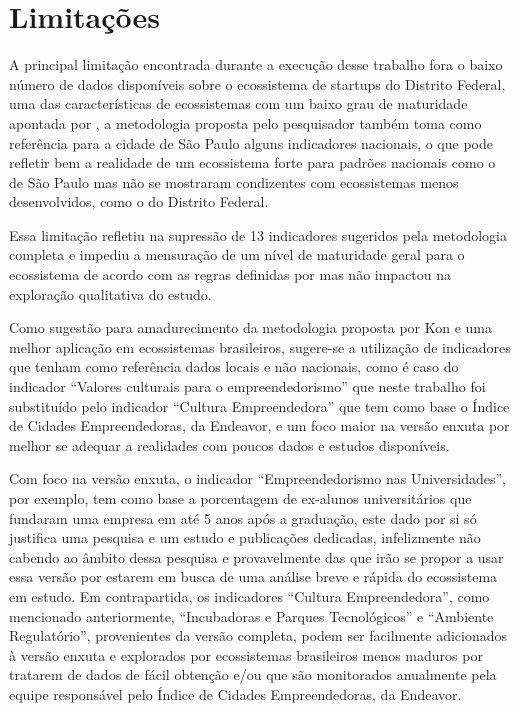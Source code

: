 \section{Limitações}
\label{subsection:limitações}

A principal limitação encontrada durante a execução desse trabalho fora o baixo número de dados disponíveis sobre o ecossistema de startups do Distrito Federal, uma das características de ecossistemas com um baixo grau de maturidade apontada por , a metodologia proposta pelo pesquisador também toma como referência para a cidade de São Paulo alguns indicadores nacionais, o que pode refletir bem a realidade de um ecossistema forte para padrões nacionais como o de São Paulo mas não se mostraram condizentes com ecossistemas menos desenvolvidos, como o do Distrito Federal.

Essa limitação refletiu na supressão de 13 indicadores sugeridos pela metodologia completa e impediu a mensuração de um nível de maturidade geral para o ecossistema de acordo com as regras definidas por  mas não impactou na exploração qualitativa do estudo.

Como sugestão para amadurecimento da metodologia proposta por Kon e uma melhor aplicação em ecossistemas brasileiros, sugere-se a utilização de indicadores que tenham como referência dados locais e não nacionais, como é caso do indicador ``Valores culturais para o empreendedorismo'' que neste trabalho foi substituído pelo indicador ``Cultura Empreendedora'' que tem como base o Índice de Cidades Empreendedoras, da Endeavor, e um foco maior na versão enxuta por melhor se adequar a realidades com poucos dados e estudos disponíveis. 

Com foco na versão enxuta, o indicador ``Empreendedorismo nas Universidades'', por exemplo, tem como base a porcentagem de ex-alunos universitários que fundaram uma empresa em até 5 anos após a graduação, este dado por si só justifica uma pesquisa e um estudo e publicações dedicadas, infelizmente não cabendo ao âmbito dessa pesquisa e provavelmente das que irão se propor a usar essa versão por estarem em busca de uma análise breve e rápida do ecossistema em estudo. Em contrapartida, os indicadores ``Cultura Empreendedora'', como mencionado anteriormente, ``Incubadoras e Parques Tecnológicos'' e ``Ambiente Regulatório'', provenientes da versão completa, podem ser facilmente adicionados à versão enxuta e explorados por ecossistemas brasileiros menos maduros por tratarem de dados de fácil obtenção e/ou que são monitorados anualmente pela equipe responsável pelo Índice de Cidades Empreendedoras, da Endeavor.

